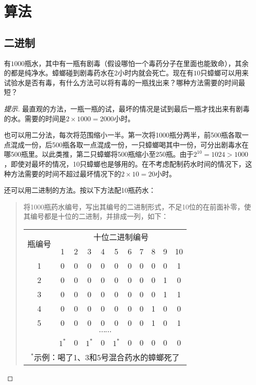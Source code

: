 
\chapter{算法}
\label{chap:algorithm}

\section{二进制}
\label{sec:binary-system}

\begin{example}
  有$1000$瓶水，其中有一瓶有剧毒（假设哪怕一个毒药分子在里面也能致命），其余的都是纯净水。蟑螂碰到剧毒药水在$2$小时内就会死亡。现在有$10$只蟑螂可以用来试验水是否有毒，有什么方法可以将有毒的一瓶找出来？哪种方法需要的时间最短？
\end{example}
\begin{proof}[提示]
  最直观的方法，一瓶一瓶的试，最坏的情况是试到最后一瓶才找出来有剧毒的水。需要的时间是$2\times1000=2000$小时。

  也可以用二分法，每次将范围缩小一半。第一次将1000瓶分两半，前500瓶各取一点混成一份，后500瓶各取一点混成一份，一只蟑螂喝其中一份，可分出剧毒水在哪500瓶里。以此类推，第二只蟑螂将500瓶缩小至250瓶。由于$2^{10}=1024>1000$，即使对最坏的情况，10只蟑螂也是够用的。在不考虑配制药水时间的情况下，这种方法需要的时间不超过最坏情况下的$2\times10=20$小时。

  还可以用二进制的方法。按以下方法配10瓶药水：
  \begin{quotation}
    将1000瓶药水编号，写出其编号的二进制形式，不足10位的在前面补零，使其编号都是十位的二进制，并排成一列，如下：
    \begin{center}
    \begin{tabular}{ccccccccccc}
      \toprule[2pt]
      \multirow{2}{*}{瓶编号} & \multicolumn{10}{c}{十位二进制编号}\\
      \cline{2-11} & 1 & 2 & 3 & 4 & 5 & 6 & 7 & 8 & 9 & 10\\
      \midrule
      1 & 0 & 0 & 0 & 0 & 0 & 0 & 0 & 0 & 0 & 1\\
      2 & 0 & 0 & 0 & 0 & 0 & 0 & 0 & 0 & 1 & 0\\
      3 & 0 & 0 & 0 & 0 & 0 & 0 & 0 & 0 & 1 & 1\\
      4 & 0 & 0 & 0 & 0 & 0 & 0 & 0 & 1 & 0 & 0\\
      5 & 0 & 0 & 0 & 0 & 0 & 0 & 0 & 1 & 0 & 1\\
      \multicolumn{11}{c}{$\cdots\cdots$}\\
      \hline
        & $1^*$ & 0 & $1^*$ & 0 & $1^*$ & 0 & 0 & 0 & 0 & 0\\
      \multicolumn{11}{c}{$^*$示例：喝了1、3和5号混合药水的蟑螂死了}\\  
      \bottomrule[2pt]
    \end{tabular}
    \end{center}


\end{quotation}
\end{proof}
